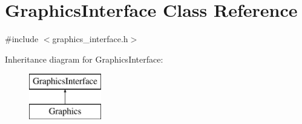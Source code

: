 \hypertarget{classGraphicsInterface}{\section{Graphics\-Interface Class Reference}
\label{classGraphicsInterface}
}


{\ttfamily \#include $<$graphics\-\_\-interface.\-h$>$}

Inheritance diagram for Graphics\-Interface\-:\begin{figure}[H]
\begin{center}
\leavevmode
\includegraphics[height=2.000000cm]{classGraphicsInterface}
\end{center}
\end{figure}
